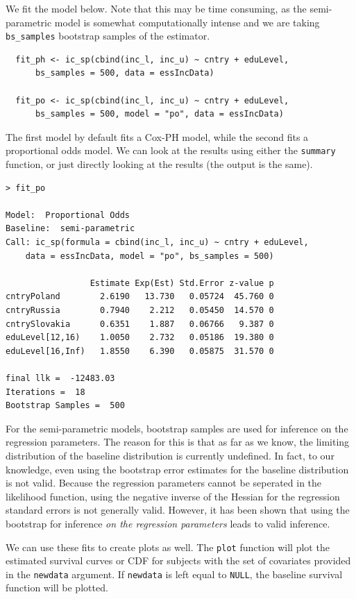 \documentclass[11pt]{report}
\begin{document}
  We fit the model below. Note that this may be time consuming, as the semi-parametric
  model is somewhat computationally intense and we are 
  taking \texttt{bs\_samples} bootstrap samples of the estimator. 
  
  \begin{verbatim}
  fit_ph <- ic_sp(cbind(inc_l, inc_u) ~ cntry + eduLevel,
      bs_samples = 500, data = essIncData)
      
  fit_po <- ic_sp(cbind(inc_l, inc_u) ~ cntry + eduLevel,
      bs_samples = 500, model = "po", data = essIncData)
  \end{verbatim}

  The first model by default fits a Cox-PH model, while the second fits
  a proportional odds model. We can look at the results using either the
  \texttt{summary} function, or just directly looking at the results
  (the output is the same). 
  
  \begin{verbatim}
> fit_po

Model:  Proportional Odds 
Baseline:  semi-parametric 
Call: ic_sp(formula = cbind(inc_l, inc_u) ~ cntry + eduLevel, 
    data = essIncData, model = "po", bs_samples = 500)

                 Estimate Exp(Est) Std.Error z-value p
cntryPoland        2.6190   13.730   0.05724  45.760 0
cntryRussia        0.7940    2.212   0.05450  14.570 0
cntrySlovakia      0.6351    1.887   0.06766   9.387 0
eduLevel[12,16)    1.0050    2.732   0.05186  19.380 0
eduLevel[16,Inf)   1.8550    6.390   0.05875  31.570 0

final llk =  -12483.03 
Iterations =  18 
Bootstrap Samples =  500 
  \end{verbatim}

  For the semi-parametric models, bootstrap samples are used
  for inference on the regression parameters. The reason for this 
  is that as far as we know, the limiting distribution of the 
  baseline distribution is currently undefined. In fact, to our 
  knowledge, even using the bootstrap error estimates for the baseline
  distribution is not valid. Because the regression parameters cannot
  be seperated in the likelihood function, using the negative inverse of the Hessian
  for the regression standard errors is not generally valid. However, it has been
  shown that using the bootstrap for inference \emph{on the regression parameters}
  leads to valid inference. 

  We can use these fits to create plots as well. The \texttt{plot} function 
  will plot the estimated survival curves or CDF for subjects with the set of 
  covariates provided in the \texttt{newdata} argument. If \texttt{newdata}
  is left equal to \texttt{NULL}, the baseline survival function will be plotted. 
  
\end{document}
